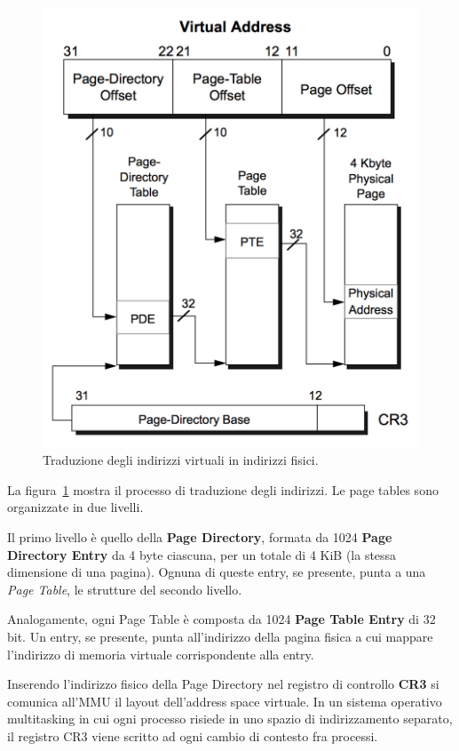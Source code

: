 \documentclass[12pt,a4paper]{report}
\begin{document}
		\begin{figure}[htbp]
		\centering
		\includegraphics[scale=0.46]{img/translation.png}
		\caption{Traduzione degli indirizzi virtuali in indirizzi fisici. \cite{AMD}\label{fig:translation}}
		\end{figure}
		
		La figura~\ref{fig:translation} mostra il processo di traduzione degli indirizzi. Le page tables sono organizzate
		in due livelli.
		
		Il primo livello è quello della \textbf{Page Directory}, formata da 1024 \textbf{Page Directory Entry} da 4 byte
		ciascuna, per un totale di 4 KiB (la stessa dimensione di una pagina). Ognuna di queste entry, se presente, punta
		a una \emph{Page Table}, le strutture del secondo livello.
		
		Analogamente, ogni Page Table è composta da 1024 \textbf{Page Table Entry} di 32 bit. Un entry, se presente,
		punta all'indirizzo della pagina fisica a cui mappare l'indirizzo di memoria virtuale corrispondente alla entry.
		
		Inserendo l'indirizzo fisico della Page Directory nel registro di controllo \textbf{CR3} si comunica all'MMU il layout
		dell'address space virtuale. In un sistema operativo multitasking in cui ogni processo risiede in uno spazio
		di indirizzamento separato, il registro CR3 viene scritto ad ogni cambio di contesto fra processi.
		
\end{document}
